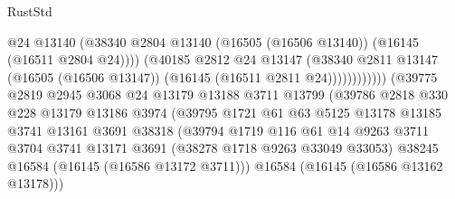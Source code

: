 \begin{lexlean}{RustStd}
\begin{coremodule}
                                            @24
                                            @13140
                                            (@38340
                                              @2804
                                              @13140
                                              (@16505 (@16506 @13140))
                                              (@16145 (@16511 @2804 @24))))
                                          (@40185
                                            @2812
                                            @24
                                            @13147
                                            (@38340
                                              @2811
                                              @13147
                                              (@16505 (@16506 @13147))
                                              (@16145 (@16511 @2811 @24))))))))))))
                          (@39775
                            @2819
                            @2945
                            @3068
                            @24
                            @13179
                            @13188
                            @3711
                            @13799
                            (@39786
                              @2818
                              @330
                              @228
                              @13179
                              @13186
                              @3974
                              (@39795
                                @1721
                                @61
                                @63
                                @5125
                                @13178
                                @13185
                                @3741
                                @13161
                                @3691
                                @38318
                                (@39794
                                  @1719
                                  @116
                                  @61
                                  @14
                                  @9263
                                  @3711
                                  @3704
                                  @3741
                                  @13171
                                  @3691
                                  (@38278 @1718 @9263 @33049 @33053)
                                  @38245
                                  @16584
                                  (@16145 (@16586 @13172 @3711)))
                                @16584
                                (@16145 (@16586 @13162 @13178)))

\end{coremodule}
\end{lexlean}
